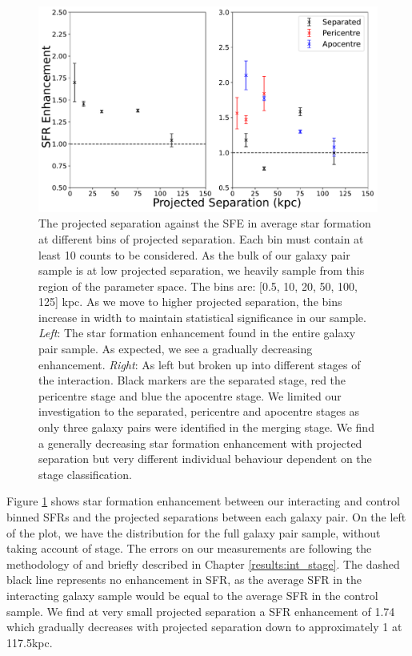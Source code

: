 \begin{figure}
\centering
\includegraphics[width=\textwidth]{Chapter3/figures/sfr-enhancement-projected-sep.pdf}
\caption[The projected separation against the SFE in average star formation at different bins of projected separation.]{The projected separation against the SFE in average star formation at different bins of projected separation. Each bin must contain at least 10 counts to be considered. As the bulk of our galaxy pair sample is at low projected separation, we heavily sample from this region of the parameter space. The bins are: [0.5, 10, 20, 50, 100, 125] kpc. As we move to higher projected separation, the bins increase in width to maintain statistical significance in our sample. \textit{Left}: The star formation enhancement found in the entire galaxy pair sample. As expected, we see a gradually decreasing enhancement. \textit{Right}: As left but broken up into different stages of the interaction. Black markers are the separated stage, red the pericentre stage and blue the apocentre stage. We limited our investigation to the separated, pericentre and apocentre stages as only three galaxy pairs were identified in the merging stage. We find a generally decreasing star formation enhancement with projected separation but very different individual behaviour dependent on the stage classification.}
\label{fig:sfr-enhancement-sep}
\end{figure}

Figure \ref{fig:sfr-enhancement-sep} shows star formation enhancement between our interacting and control binned SFRs and the projected separations between each galaxy pair. On the left of the plot, we have the distribution for the full galaxy pair sample, without taking account of stage. The errors on our measurements are following the methodology of \citet{2011PASA...28..128C} and briefly described in Chapter \ref{results:int_stage}. The dashed black line represents no enhancement in SFR, as the average SFR in the interacting galaxy sample would be equal to the average SFR in the control sample. We find at very small projected separation a SFR enhancement of 1.74 which gradually decreases with projected separation down to approximately 1 at 117.5kpc. 

